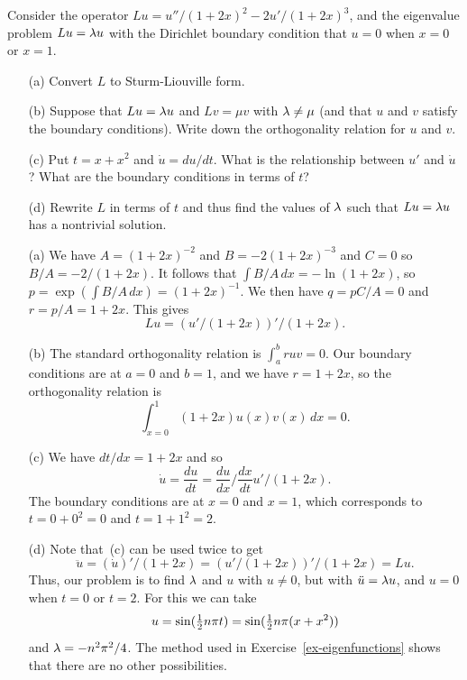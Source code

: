 \documentclass[a4paper]{amsart}
\begin{document}
\begin{exercise}\label{ex-sturm-a}
 Consider the operator $Lu=u''/(1+2x)^2-2u'/(1+2x)^3$, and the
 eigenvalue problem $Lu=\lambda u$ with the Dirichlet boundary condition
 that $u=0$ when $x=0$ or $x=1$.
 \begin{itemize}
  \item[(a)] Convert $L$ to Sturm-Liouville form.
  \item[(b)] Suppose that $Lu=\lambda u$ and $Lv=\mu v$ with $\lambda\neq\mu$
   (and that $u$ and $v$ satisfy the boundary conditions).  Write down
   the orthogonality relation for $u$ and $v$.
  \item[(c)] Put $t=x+x^2$ and $\dot{u}=du/dt$.  What is the
   relationship between $u'$ and $\dot{u}$?  What are the boundary
   conditions in terms of $t$?
  \item[(d)] Rewrite $L$ in terms of $t$ and thus find the values of
   $\lambda$ such that $Lu=\lambda u$ has a nontrivial solution.
 \end{itemize}
\end{exercise}
\begin{solution}
 \begin{itemize}
  \item[(a)] We have $A=(1+2x)^{-2}$ and $B=-2(1+2x)^{-3}$ and $C=0$
   so $B/A=-2/(1+2x)$.  It follows that $\int B/A\,dx=-\ln(1+2x)$, so
   $p=\exp\left(\int B/A\,dx\right)=(1+2x)^{-1}$.  We then have
   $q=pC/A=0$ and $r=p/A=1+2x$.  This gives 
   \[ Lu = (u'/(1+2x))'/(1+2x). \]
  \item[(b)] The standard orthogonality relation is $\int_a^b ruv=0$.
   Our boundary conditions are at $a=0$ and $b=1$, and we have
   $r=1+2x$, so the orthogonality relation is
   \[ \int_{x=0}^1 (1+2x)u(x)v(x)\, dx = 0. \]
  \item[(c)] We have $dt/dx=1+2x$ and so 
   \[ \dot{u} = \frac{du}{dt} = \frac{du}{dx}/\frac{dx}{dt}
       u'/(1+2x).
   \]
   The boundary conditions are at $x=0$ and $x=1$, which corresponds
   to $t=0+0^2=0$ and $t=1+1^2=2$.
  \item[(d)] Note that~(c) can be used twice to get 
   \[ \ddot{u} = (\dot{u})'/(1+2x) = 
       (u'/(1+2x))'/(1+2x) = Lu.
   \]
   Thus, our problem is to find $\lambda$ and $u$ with $u\neq 0$, but
   with $\ddot{u}=\lambda u$, and $u=0$ when $t=0$ or $t=2$.  For this we
   can take 
   \[ u=\sin(\tfrac{1}{2} n\pi t)=\sin(\tfrac{1}{2} n\pi(x+x^2)) \]
   and $\lambda=-n^2\pi^2/4$.  The method used in
   Exercise~\ref{ex-eigenfunctions} shows that there are no other
   possibilities. 
 \end{itemize}
\end{solution}
\end{document}
